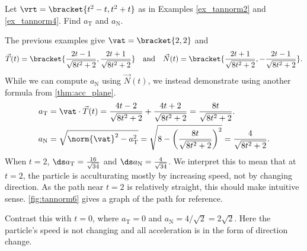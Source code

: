 {Let $\vrt=\bracket{t^2-t,t^2+t}$ as in Examples \ref{ex_tannorm2} and \ref{ex_tannorm4}. Find $a_\text{T}$ and $a_\text{N}$.}
{The previous examples give $\vat =\bracket{2,2}$ and
\[\vec T(t) =\bracket{\frac{2t-1}{\sqrt{8t^2+2}},\frac{2t+1}{\sqrt{8t^2+2}}}\quad \text{and}\quad \vec N(t) =\bracket{\frac{2t+1}{\sqrt{8t^2+2}},-\frac{2t-1}{\sqrt{8t^2+2}}}.\]
While we can compute $a_\text{N}$ using $\vec N(t)$, we instead demonstrate using another formula from \autoref{thm:acc_plane}.
\begin{align*}
a_\text{T} &= \vat\cdot\vec T(t) = \frac{4t-2}{\sqrt{8t^2+2}}+\frac{4t+2}{\sqrt{8t^2+2}} = \frac{8t}{\sqrt{8t^2+2}}.\\
a_\text{N} &= \sqrt{\norm{\vat}^2-a_\text{T}^2} = \sqrt{8-\left(\frac{8t}{\sqrt{8t^2+2}}\right)^2}=\frac{4}{\sqrt{8t^2+2}}.\medskip
\end{align*}
When $t=2$, $\ds a_{\text{T}} = \frac{16}{\sqrt{34}}%
$ and $\ds a_{\text{N}} = \frac{4}{\sqrt{34}}%
$. We interpret this to mean that at $t=2$, the particle is acculturating mostly by increasing speed, not by changing direction. As the path near $t=2$ is relatively straight, this should make intuitive sense. \autoref{fig:tannorm6} gives a graph of the path for reference.

Contrast this with $t=0$, where $a_{\text{T}}=0$ and $a_{\text{N}}=4/\sqrt2=2\sqrt2 %
$. Here the particle's speed is not changing and all acceleration is in the form of direction change.}

